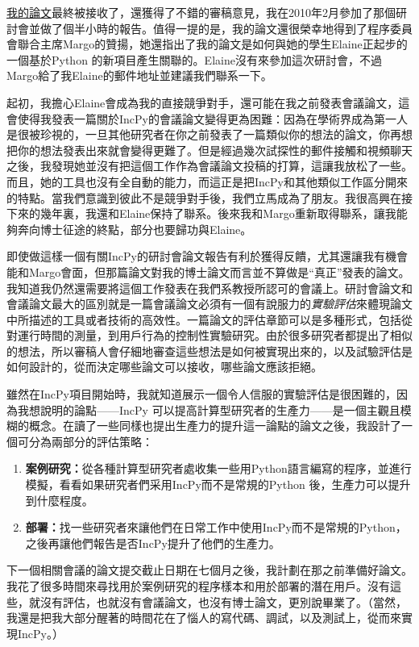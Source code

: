 \documentclass[12pt,UTF8,nofonts]{book}
\begin{document}
\href{http://www.pgbovine.net/projects/pubs/guo_tapp10_camera_ready.pdf}{我的論文}最終被接收了，還獲得了不錯的審稿意見，我在2010年2月參加了那個研討會並做了個半小時的報告。值得一提的是，我的論文還很榮幸地得到了程序委員會聯合主席Margo的贊揚，她還指出了我的論文是如何與她的學生Elaine正起步的一個基於Python 的新項目產生關聯的。Elaine沒有來參加這次研討會，不過Margo給了我Elaine的郵件地址並建議我們聯系一下。

起初，我擔心Elaine會成為我的直接競爭對手，還可能在我之前發表會議論文，這會使得我發表一篇關於IncPy的會議論文變得更為困難：因為在學術界成為第一人是很被珍視的，一旦其他研究者在你之前發表了一篇類似你的想法的論文，你再想把你的想法發表出來就會變得更難了。但是經過幾次試探性的郵件接觸和視頻聊天之後，我發現她並沒有把這個工作作為會議論文投稿的打算，這讓我放松了一些。而且，她的工具也沒有全自動的能力，而這正是把IncPy和其他類似工作區分開來的特點。當我們意識到彼此不是競爭對手後，我們立馬成為了朋友。我很高興在接下來的幾年裏，我還和Elaine保持了聯系。後來我和Margo重新取得聯系，讓我能夠奔向博士征途的終點，部分也要歸功與Elaine。

\breakline

即使做這樣一個有關IncPy的研討會論文報告有利於獲得反饋，尤其還讓我有機會能和Margo會面，但那篇論文對我的博士論文而言並不算做是“真正”發表的論文。我知道我仍然還需要將這個工作發表在我們系教授所認可的會議上。研討會論文和會議論文最大的區別就是一篇會議論文必須有一個有說服力的\emph{實驗評估}來體現論文中所描述的工具或者技術的高效性。一篇論文的評估章節可以是多種形式，包括從對運行時間的測量，到用戶行為的控制性實驗研究。由於很多研究者都提出了相似的想法，所以審稿人會仔細地審查這些想法是如何被實現出來的，以及試驗評估是如何設計的，從而決定哪些論文可以接收，哪些論文應該拒絕。

雖然在IncPy項目開始時，我就知道展示一個令人信服的實驗評估是很困難的，因為我想說明的論點——IncPy 可以提高計算型研究者的生產力——是一個主觀且模糊的概念。在讀了一些同樣也提出生產力的提升這一論點的論文之後，我設計了一個可分為兩部分的評估策略：
\begin{enumerate}
  \item \textbf{案例研究：}從各種計算型研究者處收集一些用Python語言編寫的程序，並進行模擬，看看如果研究者們采用IncPy而不是常規的Python 後，生產力可以提升到什麼程度。
  \item \textbf{部署：}找一些研究者來讓他們在日常工作中使用IncPy而不是常規的Python，之後再讓他們報告是否IncPy提升了他們的生產力。
\end{enumerate}
下一個相關會議的論文提交截止日期在七個月之後，我計劃在那之前準備好論文。我花了很多時間來尋找用於案例研究的程序樣本和用於部署的潛在用戶。沒有這些，就沒有評估，也就沒有會議論文，也沒有博士論文，更別說畢業了。（當然，我還是把我大部分醒著的時間花在了惱人的寫代碼、調試，以及測試上，從而來實現IncPy。）
\end{document}
